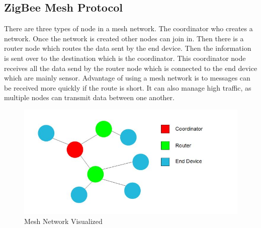 \subsection{ZigBee Mesh Protocol}
	\par There are three types of node in a mesh network. The coordinator who creates a network. Once the network is created other nodes can join in. Then there is a router node which routes the data sent by the end device. Then the information is sent over to the destination which is the coordinator. This coordinator node receives all the data send by the router node which is connected to the end device which are mainly sensor. Advantage of using a mesh network is to messages can be received more quickly if the route is short. It can also manage high traffic, as multiple nodes can transmit data between one another. 
	\begin{figure}
		\centering
		\includegraphics[width=\linewidth]{mesh.jpg}
		\caption{Mesh Network Visualized}
		\label{fig:mesh}
	\end{figure}
